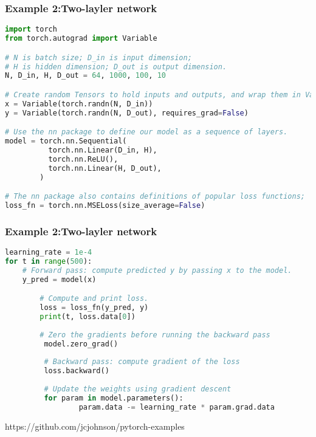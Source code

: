 \begin{frame}[fragile]
\MyLogo
\frametitle{Example 2:Two-layler network}  
\scriptsize{
\begin{lstlisting}[language=python]
import torch
from torch.autograd import Variable

# N is batch size; D_in is input dimension;
# H is hidden dimension; D_out is output dimension.
N, D_in, H, D_out = 64, 1000, 100, 10

# Create random Tensors to hold inputs and outputs, and wrap them in Variables.
x = Variable(torch.randn(N, D_in))
y = Variable(torch.randn(N, D_out), requires_grad=False)

# Use the nn package to define our model as a sequence of layers.
model = torch.nn.Sequential(
          torch.nn.Linear(D_in, H),
          torch.nn.ReLU(),
          torch.nn.Linear(H, D_out),
        )

# The nn package also contains definitions of popular loss functions;
loss_fn = torch.nn.MSELoss(size_average=False)
\end{lstlisting}
}
\end{frame}

\begin{frame}[fragile]
\MyLogo
\frametitle{Example 2:Two-layler network}  
\ContinueLineNumber
\scriptsize{
\begin{lstlisting}[language=python]
learning_rate = 1e-4
for t in range(500):
	# Forward pass: compute predicted y by passing x to the model.
	y_pred = model(x)

        # Compute and print loss.
        loss = loss_fn(y_pred, y)
        print(t, loss.data[0])
        
        # Zero the gradients before running the backward pass
         model.zero_grad()
         
         # Backward pass: compute gradient of the loss
         loss.backward()
         
         # Update the weights using gradient descent
         for param in model.parameters():
                 param.data -= learning_rate * param.grad.data
\end{lstlisting}
}

\begin{center}
{\color{red}
https://github.com/jcjohnson/pytorch-examples
}
\end{center}

\end{frame}